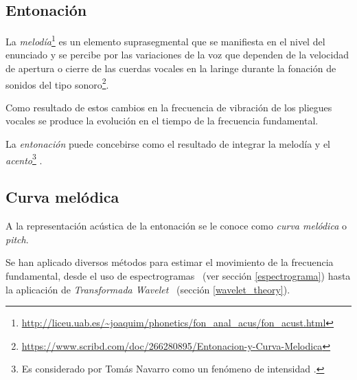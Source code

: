 \subsection{Entonaci\'on} 
La \emph{melod\'ia}\footnote{\url{http://liceu.uab.es/~joaquim/phonetics/fon_anal_acus/fon_acust.html}} \cite{hualde2005sounds, castellanos2004estimacion} es un elemento suprasegmental que se manifiesta en el nivel del enunciado  y se percibe por las variaciones de la voz que dependen de la velocidad de apertura o cierre de las cuerdas vocales en la laringe durante la fonaci\'on de sonidos del tipo sonoro\footnote{\url{https://www.scribd.com/doc/266280895/Entonacion-y-Curva-Melodica}}.

Como resultado de estos cambios en la frecuencia de vibraci\'on de los pliegues vocales se produce la evoluci\'on en el
 tiempo de la frecuencia fundamental\cite{pierrehumbert1981synthesizing, alessandroni2019vocalidades}.


La \emph{entonaci\'on} \cite{serena2002teoria} puede concebirse como el resultado de integrar la melod\'ia y el \emph{acento}\footnote{Es considerado por Tom\'as Navarro como un fen\'omeno de intensidad \cite{ruiz2014entonacion}.} \cite{font2008melodia}. 



\subsection{Curva mel\'odica}
A la representaci\'on ac\'ustica de la entonaci\'on se le conoce como \emph{curva mel\'odica} o \emph{pitch}. 


Se han aplicado diversos m\'etodos para estimar el movimiento de la frecuencia fundamental, desde el uso de espectrogramas ~(ver secci\'on \ref{espectrograma}) \cite{diaz2003algoritmo} hasta la aplicaci\'on de \emph{Transformada Wavelet} \cite{castellanos2004estimacion}~(secci\'on \ref{wavelet_theory}).

